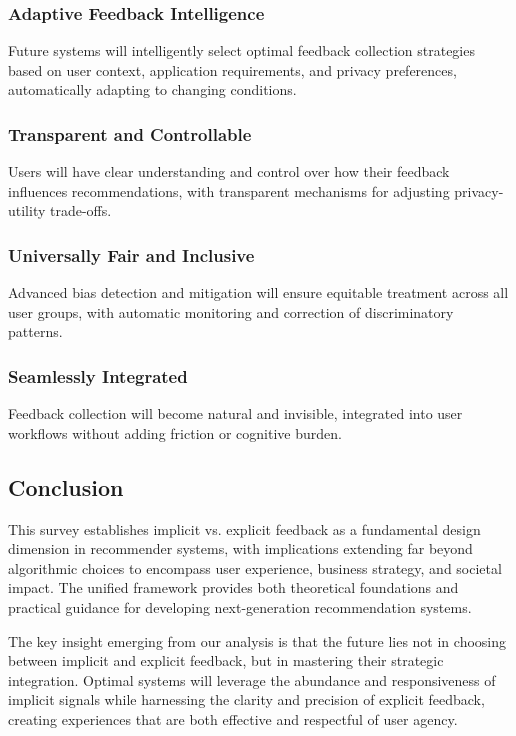 \subsubsection{Adaptive Feedback Intelligence}
Future systems will intelligently select optimal feedback collection strategies based on user context, application requirements, and privacy preferences, automatically adapting to changing conditions.

\subsubsection{Transparent and Controllable}
Users will have clear understanding and control over how their feedback influences recommendations, with transparent mechanisms for adjusting privacy-utility trade-offs.

\subsubsection{Universally Fair and Inclusive}
Advanced bias detection and mitigation will ensure equitable treatment across all user groups, with automatic monitoring and correction of discriminatory patterns.

\subsubsection{Seamlessly Integrated}
Feedback collection will become natural and invisible, integrated into user workflows without adding friction or cognitive burden.

\subsection{Conclusion}

This survey establishes implicit vs. explicit feedback as a fundamental design dimension in recommender systems, with implications extending far beyond algorithmic choices to encompass user experience, business strategy, and societal impact. The unified framework provides both theoretical foundations and practical guidance for developing next-generation recommendation systems.

The key insight emerging from our analysis is that the future lies not in choosing between implicit and explicit feedback, but in mastering their strategic integration. Optimal systems will leverage the abundance and responsiveness of implicit signals while harnessing the clarity and precision of explicit feedback, creating experiences that are both effective and respectful of user agency.

